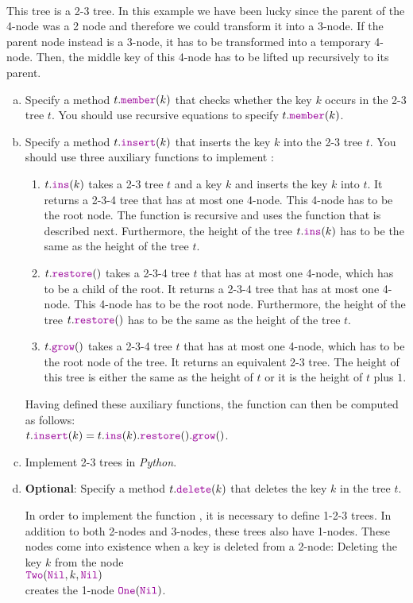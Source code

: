 \\[0.2cm]
This tree is a 2-3 tree.  In this example we have been lucky since the parent of the 4-node was
a 2 node and therefore we could transform it into a 3-node.  If the parent node instead is a 3-node,
it has to be transformed into a temporary 4-node.  Then, the middle key of this 4-node has to be
lifted up recursively to its parent.  
\begin{enumerate}[(a)]
\item Specify a method $t.\mytt{member}(k)$ that checks whether the key $k$ occurs in the 2-3 tree
      $t$.  You should use recursive equations to specify  $t.\mytt{member}(k)$.
\item Specify a method $t.\mytt{insert}(k)$ that inserts the key $k$ into the 2-3 tree
      $t$.  You should use three auxiliary functions to implement :
      \begin{enumerate}
      \item $t.\mytt{ins}(k)$ takes a 2-3 tree $t$ and a key $k$ and inserts the key $k$ into $t$.
            It returns a 2-3-4 tree that has at most one 4-node.  This 4-node has to be the root node.
            The function  is recursive and uses the function  that is described next.
            Furthermore, the height of the tree $t.\mytt{ins}(k)$ has to be the same as the height of the tree $t$.
      \item $t.\mytt{restore}()$ takes a 2-3-4 tree $t$ that has at most one 4-node, which has to be a child
            of the root.  It returns a 2-3-4 tree that has at most one 4-node.  This 4-node has to be the root node.
            Furthermore, the height of the tree $t.\mytt{restore}()$ has to be the same as the height of the tree $t$.
      \item $t.\mytt{grow}()$ takes a 2-3-4 tree $t$ that has at most one 4-node, which has to be the root
            node of the tree.  It returns an equivalent 2-3 tree.  The height of this tree is either the same
            as the height of $t$ or it is the height of $t$ plus $1$.
      \end{enumerate}
      Having defined these auxiliary functions, the function  can then be computed as follows:
      \\[0.2cm]
      \hspace*{1.3cm}
      $t.\mytt{insert}(k) = t.\mytt{ins}(k).\mytt{restore}().\mytt{grow}()$.
\item Implement 2-3 trees in \textsl{Python}.
\item \textbf{Optional}: Specify a method $t.\mytt{delete}(k)$ that deletes the key $k$ in the tree $t$.

      In order to implement the function , it is necessary to define 1-2-3 trees.
      In addition to both 2-nodes and 3-nodes, these trees also have 1-nodes.  These nodes come into existence
      when a key is deleted from a 2-node:  Deleting the key $k$ from the node
      \\[0.2cm]
      \hspace*{1.3cm}
      $\mytt{Two}(\mytt{Nil}, k, \mytt{Nil})$
      \\[0.2cm]
      creates the 1-node $\mytt{One}(\mytt{Nil})$.
\end{enumerate}

